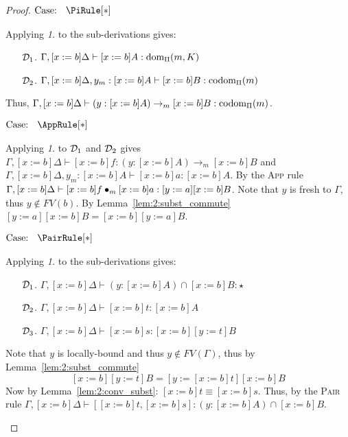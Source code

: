 \begin{proof}
    $\text{Case: }\begin{array}{c} \PiRule[*] \end{array}$
    \begin{proofcase}
        Applying \textit{1.} to the sub-derivations gives:
        \begin{enumerate}
            \item[$\mathcal{D}_{1}$.] $\Gamma, [x := b]\Delta \vdash [x := b]A : \mbox{\normalfont dom}_\Pi(m, K)$
            \item[$\mathcal{D}_{2}$.] $\Gamma, [x := b]\Delta, y_m : [x := b]A \vdash [x := b]B : \mbox{\normalfont codom}_\Pi(m)$
        \end{enumerate}
        Thus, $\Gamma, [x := b]\Delta \vdash (y : [x := b]A) \to_m [x := b]B : \mbox{\normalfont codom}_\Pi(m)$.
    \end{proofcase}

    $\text{Case: }\begin{array}{c} \AppRule[*] \end{array}$
    \begin{proofcase}
        Applying \textit{1.} to $\mathcal{D}_{1}$ and $\mathcal{D}_{2}$ gives $\Gamma, [x := b]\Delta \vdash [x := b]f : (y : [x := b]A) \to_m [x := b]B$ and $\Gamma, [x := b]\Delta, y_m : [x := b]A \vdash [x := b]a : [x := b]A$.
        By the \textsc{App} rule $\Gamma, [x := b]\Delta \vdash [x := b]f \bullet_{m} [x := b]a : [y := a][x := b]B$.
        Note that $y$ is fresh to $\Gamma$, thus $y \notin FV(b)$.
        By Lemma~\ref{lem:2:subst_commute} $[y := a][x := b]B = [x := b][y := a]B$.
    \end{proofcase}

    $\text{Case: }\begin{array}{c} \PairRule[*] \end{array}$
    \begin{proofcase}
        Applying \textit{1.} to the sub-derivations gives:
        \begin{enumerate}
            \item[$\mathcal{D}_{1}$.] $\Gamma, [x := b]\Delta \vdash (y : [x := b]A) \cap [x := b]B : \star$
            \item[$\mathcal{D}_{2}$.] $\Gamma, [x := b]\Delta \vdash [x := b]t : [x := b]A$
            \item[$\mathcal{D}_{3}$.] $\Gamma, [x := b]\Delta \vdash [x := b]s : [x := b][y := t]B$
        \end{enumerate}
        Note that $y$ is locally-bound and thus $y \notin FV(\Gamma)$, thus by Lemma~\ref{lem:2:subst_commute} $$[x := b][y := t]B = [y := [x := b]t][x := b]B$$
        Now by Lemma~\ref{lem:2:conv_subst}: $[x := b]t \equiv [x := b]s$.
        Thus, by the \textsc{Pair} rule $\Gamma, [x := b]\Delta \vdash [[x := b]t, [x := b]s] : (y : [x := b]A) \cap [x := b]B$.
    \end{proofcase}
\end{proof}


